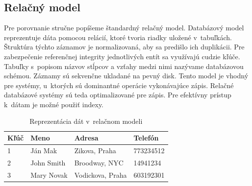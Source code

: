 \documentclass[11pt,twoside,a4paper]{book}
\begin{document}

\subsection{Relačný model}
Pre porovnanie stručne popíšeme štandardný relačný model. Databázový model reprezentuje dáta pomocou relácií, ktoré tvoria riadky uložené v~tabuľkách. Štruktúra týchto záznamov je normalizovaná, aby sa predišlo ich duplikácii. Pre zabezpečenie referenčnej integrity jednotlivých entít sa využívajú cudzie kľúče. Tabuľky s~popisom názvov stĺpcov a vzťahy medzi nimi nazývame databázovou schémou. Záznamy sú sekvenčne ukladané na pevný disk. Tento model je vhodný pre systémy, u~ktorých sú dominantné operácie vykonávajúce zápis. Relačné databázové systémy sú teda optimalizované pre zápis. Pre efektívny prístup k~dátam je možné použiť indexy.



\begin{table}[hp]
\begin{center}
    \begin{tabular}{l|l|l|l}

  Kľúč & Meno & Adresa & Telefón\\ \hline

  1&Ján Mak & Zikova, Praha & 773234512 \\
  2&John Smith  & Broodway, NYC & 14941234\\
  3&Mary Novak & Vodickova, Praha & 603192301\\

    \end{tabular}
\end{center}
\caption{Reprezentácia dát v~relačnom modeli}
\label{tab:Nosql}
\end{table}
\end{document}
